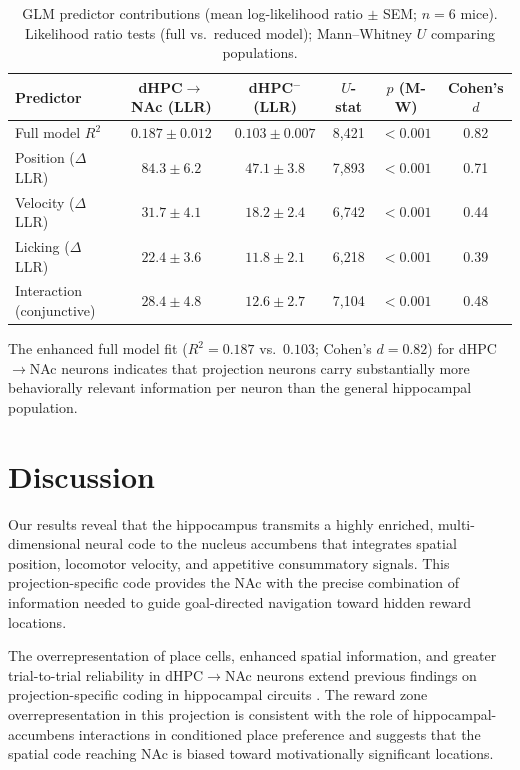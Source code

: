 \documentclass[11pt]{article}
\begin{document}
\begin{table}[htbp]
\centering
\caption{GLM predictor contributions (mean log-likelihood ratio $\pm$ SEM; $n = 6$ mice). Likelihood ratio tests (full vs.\ reduced model); Mann--Whitney $U$ comparing populations.}
\label{tab:glm}
\begin{tabular}{lccccc}
\toprule
\textbf{Predictor} & \textbf{dHPC$\to$NAc (LLR)} & \textbf{dHPC$^{-}$ (LLR)} & \textbf{$U$-stat} & \textbf{$p$ (M-W)} & \textbf{Cohen's $d$} \\
\midrule
Full model $R^2$ & $0.187 \pm 0.012$ & $0.103 \pm 0.007$ & 8,421 & $<0.001$ & 0.82 \\
Position ($\Delta$LLR) & $84.3 \pm 6.2$ & $47.1 \pm 3.8$ & 7,893 & $<0.001$ & 0.71 \\
Velocity ($\Delta$LLR) & $31.7 \pm 4.1$ & $18.2 \pm 2.4$ & 6,742 & $<0.001$ & 0.44 \\
Licking ($\Delta$LLR) & $22.4 \pm 3.6$ & $11.8 \pm 2.1$ & 6,218 & $<0.001$ & 0.39 \\
Interaction (conjunctive) & $28.4 \pm 4.8$ & $12.6 \pm 2.7$ & 7,104 & $<0.001$ & 0.48 \\
\bottomrule
\end{tabular}
\end{table}

The enhanced full model fit ($R^2 = 0.187$ vs.\ $0.103$; Cohen's $d = 0.82$) for dHPC$\to$NAc neurons indicates that projection neurons carry substantially more behaviorally relevant information per neuron than the general hippocampal population.

\section{Discussion}

Our results reveal that the hippocampus transmits a highly enriched, multi-dimensional neural code to the nucleus accumbens that integrates spatial position, locomotor velocity, and appetitive consummatory signals. This projection-specific code provides the NAc with the precise combination of information needed to guide goal-directed navigation toward hidden reward locations.

The overrepresentation of place cells, enhanced spatial information, and greater trial-to-trial reliability in dHPC$\to$NAc neurons extend previous findings on projection-specific coding in hippocampal circuits \citep{ciocchi2015selective, danielson2016distinct}. The reward zone overrepresentation in this projection is consistent with the role of hippocampal-accumbens interactions in conditioned place preference \citep{trouche2019hippocampal} and suggests that the spatial code reaching NAc is biased toward motivationally significant locations.
\end{document}
